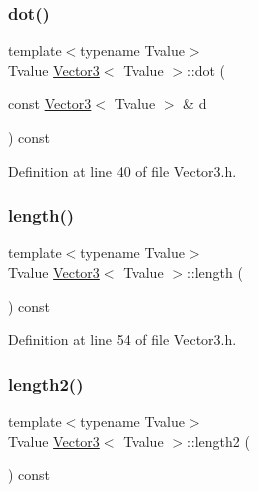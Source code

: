 \subsubsection{\texorpdfstring{dot()}{dot()}}
{\footnotesize\ttfamily template$<$typename Tvalue$>$ \\
Tvalue \hyperlink{class_vector3}{Vector3}$<$ Tvalue $>$\+::dot (\begin{DoxyParamCaption}\item[{const \hyperlink{class_vector3}{Vector3}$<$ Tvalue $>$ \&}]{d }\end{DoxyParamCaption}) const\hspace{0.3cm}{\ttfamily [inline]}}



Definition at line 40 of file Vector3.\+h.

\mbox{\label{class_vector3_a193a8d533eec9444459626e6c4faee2d}} 
\subsubsection{\texorpdfstring{length()}{length()}}
{\footnotesize\ttfamily template$<$typename Tvalue$>$ \\
Tvalue \hyperlink{class_vector3}{Vector3}$<$ Tvalue $>$\+::length (\begin{DoxyParamCaption}{ }\end{DoxyParamCaption}) const\hspace{0.3cm}{\ttfamily [inline]}}



Definition at line 54 of file Vector3.\+h.

\mbox{\label{class_vector3_a8d6f6aa9d499d65f7e32bb88f1442aef}} 
\subsubsection{\texorpdfstring{length2()}{length2()}}
{\footnotesize\ttfamily template$<$typename Tvalue$>$ \\
Tvalue \hyperlink{class_vector3}{Vector3}$<$ Tvalue $>$\+::length2 (\begin{DoxyParamCaption}{ }\end{DoxyParamCaption}) const\hspace{0.3cm}{\ttfamily [inline]}}



